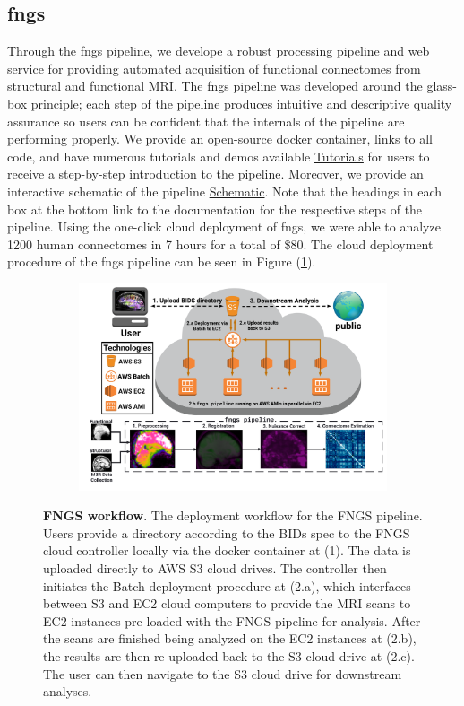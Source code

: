 \documentclass[simplex.tex]{subfiles}
\begin{document}
\subsection{fngs}

Through the fngs pipeline, we develope a robust processing pipeline and web service for providing automated acquisition of functional connectomes from structural and functional MRI. The fngs pipeline was developed around the glass-box principle; each step of the pipeline produces intuitive and descriptive quality assurance so users can be confident that the internals of the pipeline are performing properly. We provide an open-source docker container, links to all code, and have numerous tutorials and demos available \href{https://github.com/neurodatadesign/fngs}{Tutorials} for users to receive a step-by-step introduction to the pipeline. Moreover, we provide an interactive schematic of the pipeline \href{https://neurodatadesign.github.io/fngs/about_fngs/Schematic.html}{Schematic}. Note that the headings in each box at the bottom link to the documentation for the respective steps of the pipeline. Using the one-click cloud deployment of fngs, we were able to analyze 1200 human connectomes in 7 hours for a total of \$80. The cloud deployment procedure of the fngs pipeline can be seen in Figure (\ref{fig:fngs-workflow}).

\begin{figure}[h!]
\begin{cframed}[lgray]
\centering
\begin{subfigure}[h]{1\textwidth}
\includegraphics[width=\textwidth]{../../figs/fngs-workflow.png}
\end{subfigure}
\caption{\textbf{FNGS workflow}. The deployment workflow for the FNGS pipeline. Users provide a directory according to the BIDs spec to the FNGS cloud controller locally via the docker container at (1). The data is uploaded directly to AWS S3 cloud drives. The controller then initiates the Batch deployment procedure at (2.a), which interfaces between S3 and EC2 cloud computers to provide the MRI scans to EC2 instances pre-loaded with the FNGS pipeline for analysis. After the scans are finished being analyzed on the EC2 instances at (2.b), the results are then re-uploaded back to the S3 cloud drive at (2.c). The user can then navigate to the S3 cloud drive for downstream analyses.}
\label{fig:fngs-workflow}
\end{cframed}
\end{figure}
\end{document}
